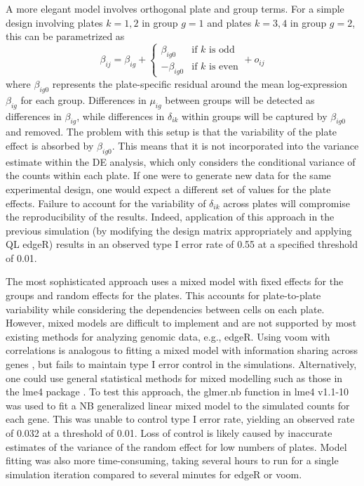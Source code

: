 \documentclass[oupdraft]{bio}
\begin{document}
A more elegant model involves orthogonal plate and group terms.
For a simple design involving plates $k=1,2$ in group $g=1$ and plates $k=3,4$ in group $g=2$, this can be parametrized as
\[
    \beta_{ij} = \beta_{ig} + 
    \begin{cases} 
        \beta_{ig0} & \mbox{if $k$ is odd} \\
        - \beta_{ig0} & \mbox{if $k$ is even}
    \end{cases}
    + o_{ij}
\]
where $\beta_{ig0}$ represents the plate-specific residual around the mean log-expression $\beta_{ig}$ for each group.
Differences in $\mu_{ig}$ between groups will be detected as differences in $\beta_{ig}$, 
    while differences in $\delta_{ik}$ within groups will be captured by $\beta_{ig0}$ and removed.
The problem with this setup is that the variability of the plate effect is absorbed by $\beta_{ig0}$.
This means that it is not incorporated into the variance estimate within the DE analysis, which only considers the conditional variance of the counts within each plate.
If one were to generate new data for the same experimental design, one would expect a different set of values for the plate effects.
Failure to account for the variability of $\delta_{ik}$ across plates will compromise the reproducibility of the results.
Indeed, application of this approach in the previous simulation (by modifying the design matrix appropriately and applying QL edgeR)
    results in an observed type I error rate of 0.55 at a specified threshold of 0.01.

The most sophisticated approach uses a mixed model with fixed effects for the groups and random effects for the plates.
This accounts for plate-to-plate variability while considering the dependencies between cells on each plate.
However, mixed models are difficult to implement and are not supported by most existing methods for analyzing genomic data, e.g., edgeR.
Using voom with correlations is analogous to fitting a mixed model with information sharing across genes \citep{smyth2005limma}, 
    but fails to maintain type I error control in the simulations.
Alternatively, one could use general statistical methods for mixed modelling such as those in the lme4 package \citep{bates2015fitting}.
To test this approach, the glmer.nb function in lme4 v1.1-10 was used to fit a NB generalized linear mixed model to the simulated counts for each gene.
This was unable to control type I error rate, yielding an observed rate of 0.032 at a threshold of 0.01.
Loss of control is likely caused by inaccurate estimates of the variance of the random effect for low numbers of plates.
Model fitting was also more time-consuming, taking several hours to run for a single simulation iteration compared to several minutes for edgeR or voom.
\end{document}

